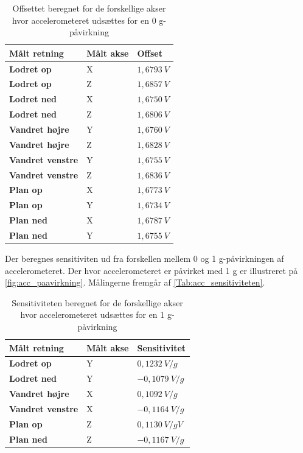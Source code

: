 \begin{table}[H]
	\centering
	\begin{tabular}{|l|l|l|}
	\textbf{Målt retning} & \textbf{Målt akse} & \textbf{Offset} \\ \hline
    \textbf{Lodret op} 		& X 		& $1,6793~V$ 	\\ \hline
    \textbf{Lodret op} 		& Z 		& $1,6857~V$ 	 \\ \hline
    \textbf{Lodret ned}		& X 		& $1,6750~V$ 	\\ \hline
    \textbf{Lodret ned}		& Z 		& $1,6806~V$  	\\ \hline
    \textbf{Vandret højre} 	& Y 		& $1,6760~V$    \\ \hline     
    \textbf{Vandret højre} 	& Z 		& $1,6828~V$ 	\\ \hline
    \textbf{Vandret venstre}	& Y 		& $1,6755~V$ 	\\ \hline
    \textbf{Vandret venstre}	& Z 		& $1,6836~V$		\\ \hline
    \textbf{Plan op} 		& X 		& $1,6773~V$		\\ \hline		
    \textbf{Plan op} 		& Y 		& $1,6734~V$    \\ \hline
    \textbf{Plan ned} 		& X 		& $1,6787~V$		\\ \hline
    \textbf{Plan ned} 		& Y 		& $1,6755~V$		\\ \hline
	\end{tabular}
	\caption{Offsettet beregnet for de forskellige akser hvor accelerometeret udsættes for en 0 g-påvirkning}
	\label{Tab:acc_offset}
\end{table}

Der beregnes sensitiviten ud fra forskellen mellem 0 og 1 g-påvirkningen af accelerometeret. Der hvor accelerometeret er påvirket med 1 g er illustreret på \autoref{fig:acc_paavirkning}. Målingerne fremgår af \autoref{Tab:acc_sensitiviteten}. 

\begin{table}[H]
	\centering
	\begin{tabular}{|l|l|l|}
	\textbf{Målt retning} & \textbf{Målt akse} & \textbf{Sensitivitet} \\ \hline
    \textbf{Lodret op} 		& Y		& $0,1232~V/g$ 	\\ \hline
    \textbf{Lodret ned}		& Y 		& $-0,1079~V/g$ 	\\ \hline
    \textbf{Vandret højre} 	& X 		& $0,1092~V/g$     \\ \hline     
    \textbf{Vandret venstre}	& X 		& $-0,1164~V/g$ 	\\ \hline
    \textbf{Plan op} 		& Z 		& $0,1130~V/gV$    	\\ \hline		
    \textbf{Plan ned} 		& Z 		& $-0,1167~V/g$		\\ \hline
	\end{tabular}
	\caption{Sensitiviteten beregnet for de forskellige akser hvor accelerometeret udsættes for en 1 g-påvirkning}
	\label{Tab:acc_offset}
\end{table}

